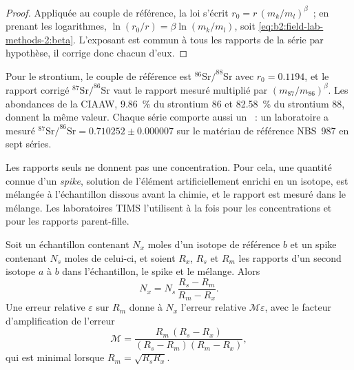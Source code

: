 \begin{proof}
Appliquée au couple de référence, la loi s'écrit $r_0 = r\,(m_k/m_l)^\beta$~; en prenant les logarithmes,
$\ln(r_0/r) = \beta\ln(m_k/m_l)$, soit \eqref{eq:b2:field-lab-methods-2:beta}. L'exposant est
commun à tous les rapports de la série par hypothèse, il corrige donc chacun d'eux.
\end{proof}

Pour le strontium, le couple de référence est $^{86}\mathrm{Sr}/^{88}\mathrm{Sr}$ avec $r_0 = 0.1194$, et
le rapport corrigé $^{87}\mathrm{Sr}/^{86}\mathrm{Sr}$ vaut le rapport mesuré multiplié par
$(m_{87}/m_{86})^\beta$. Les abondances de la CIAAW, \qty{9.86}{\percent} du strontium 86 et
\qty{82.58}{\percent} du strontium 88, donnent la même valeur. Chaque série comporte aussi un ~: un laboratoire a mesuré $^{87}\mathrm{Sr}/^{86}\mathrm{Sr} = 0.710252 \pm
0.000007$ sur le matériau de référence NBS~987 en sept séries.

Les rapports seuls ne donnent pas une concentration. Pour cela, une quantité connue d'un \emph{spike}, solution de
l'élément artificiellement enrichi en un isotope, est mélangée à l'échantillon dissous avant la chimie, et le rapport
est mesuré dans le mélange. Les laboratoires TIMS l'utilisent à la fois pour les
concentrations et pour les rapports parent-fille.

\begin{proposition}\label{prop:b2:field-lab-methods-2:id}
Soit un échantillon contenant $N_x$ moles d'un isotope de référence $b$ et un spike contenant $N_s$ moles de celui-ci, et soient
$R_x$, $R_s$ et $R_m$ les rapports d'un second isotope $a$ à $b$ dans l'échantillon, le spike et
le mélange. Alors
\begin{equation}
N_x = N_s\,\frac{R_s - R_m}{R_m - R_x} .
\label{eq:b2:field-lab-methods-2:id}
\end{equation}
Une erreur relative $\varepsilon$ sur $R_m$ donne à $N_x$ l'erreur relative $\mathcal{M}\varepsilon$,
avec le facteur d'amplification de l'erreur
\begin{equation}
\mathcal{M} = \frac{R_m\,(R_s - R_x)}{(R_s - R_m)(R_m - R_x)} ,
\label{eq:b2:field-lab-methods-2:mag}
\end{equation}
qui est minimal lorsque $R_m = \sqrt{R_s R_x}$.
\end{proposition}

